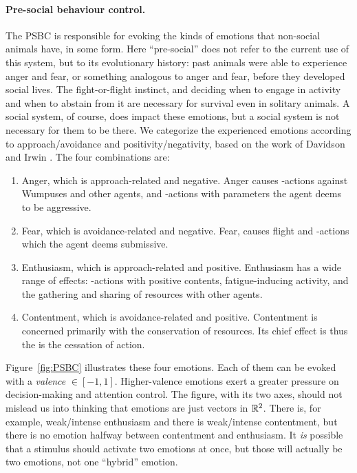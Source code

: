 \paragraph{Pre-social behaviour control.} The \textsc{PSBC} is responsible for evoking the kinds of emotions that non-social animals have, in some form. Here ``pre-social'' does not refer to the current use of this system, but to its evolutionary history: past animals were able to experience anger and fear, or something analogous to anger and fear, before they developed social lives. The fight-or-flight instinct, and deciding when to engage in activity and when to abstain from it are necessary for survival even in solitary animals. A social system, of course, does impact these emotions, but a social system is not necessary for them to be there.
We categorize the experienced emotions according to approach/avoidance and positivity/negativity, based on the work of Davidson and Irwin \cite{davidson1999}. The four combinations are:

\begin{enumerate}
	\item Anger, which is approach-related and negative. Anger causes -actions against Wumpuses and other agents, and -actions with parameters the agent deems to be aggressive.
	\item Fear, which is avoidance-related and negative. Fear, causes flight and -actions which the agent deems submissive.
	\item Enthusiasm, which is approach-related and positive. Enthusiasm has a wide range of effects: -actions with positive contents, fatigue-inducing activity, and the gathering and sharing of resources with other agents.
	\item Contentment, which is avoidance-related and positive. Contentment is concerned primarily with the conservation of resources. Its chief effect is thus the is the cessation of action.
\end{enumerate}

Figure~\ref{fig:PSBC} illustrates these four emotions. Each of them can be evoked with a {\em valence} $\in [-1,1]$. Higher-valence emotions exert a greater pressure on decision-making and attention control. The figure, with its two axes, should not mislead us into thinking that emotions are just vectors in $\mathbb{R}^2$. There is, for example, weak/intense enthusiasm and there is weak/intense contentment, but there is no emotion halfway between contentment and enthusiasm. It {\em is} possible that a stimulus should activate two emotions at once, but those will actually be two emotions, not one ``hybrid'' emotion.

